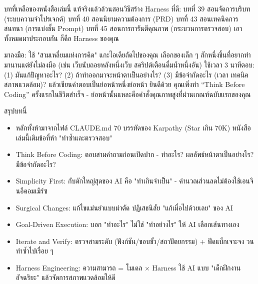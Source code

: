 บทที่เหลือของหนังสือเล่มนี้ แท้จริงแล้วล้วนสอนวิธีสร้าง Harness ที่ดี: บทที่ 39 สอนจัดการบริบท (ระบบความจำโปรเจกต์) บทที่ 40 สอนนิยามความต้องการ (PRD) บทที่ 43 สอนเทคนิคการสนทนา (การแบ่งชั้น Prompt) บทที่ 45 สอนการการันตีคุณภาพ (กระบวนการตรวจสอบ) เอาทั้งหมดมาประกอบกัน ก็คือ Harness ของคุณ

\begin{tcbpractice}{มาลงมือ: ใช้ "สามเหลี่ยมแห่งการคิด" แกะไอเดียถัดไปของคุณ}
เลือกของเล็ก ๆ สักหนึ่งชิ้นที่อยากทำมานานแต่ยังไม่ลงมือ (เช่น เว็บนับถอยหลังหนึ่งเว็บ สคริปต์เตือนดื่มน้ำหนึ่งอัน) ใช้เวลา 3 นาทีตอบ: (1) มันแก้ปัญหาอะไร? (2) ถ้าทำออกมาจะหน้าตาเป็นอย่างไร? (3) มีข้อจำกัดอะไร (เวลา เทคนิค สภาพแวดล้อม)? แล้วเขียนคำตอบเป็นย่อหน้าหนึ่งย่อหน้า ยินดีด้วย คุณเพิ่งทำ “Think Before Coding” ครั้งแรกในชีวิตสำเร็จ - ย่อหน้านั้นแหละคือคำสั่งคุณภาพสูงที่ผ่านเกณฑ์ฉบับแรกของคุณ

\end{tcbpractice}

\begin{tcbsummary}{สรุปบทนี้}
\begin{itemize}
  \item หลักทั้งห้ามาจากไฟล์ CLAUDE.md 70 บรรทัดของ Karpathy (Star เกิน 70K) หนังสือเล่มนี้เติมข้อที่ห้า "ทำซ้ำและตรวจสอบ"
  \item Think Before Coding: ตอบสามคำถามก่อนเปิดปาก - ทำอะไร? ผลลัพธ์หน้าตาเป็นอย่างไร? มีข้อจำกัดอะไร?
  \item Simplicity First: กับดักใหญ่สุดของ AI คือ "ทำเกินจำเป็น" - คำนวณส่วนลดไม่ต้องใช้เอนจินอีคอมเมิร์ซ
  \item Surgical Changes: แก้ไขแม่นยำแบบผ่าตัด ปฏิเสธนิสัย "แก้เผื่อไปด้วยเลย" ของ AI
  \item Goal-Driven Execution: บอก "ทำอะไร" ไม่ใช่ "ทำอย่างไร" ให้ AI เลือกเส้นทางเอง
  \item Iterate and Verify: ตรวจสามระดับ (ฟังก์ชัน/ขอบขั้ว/สถาปัตยกรรม) + ฟีดแบ็กเจาะจง วนทำซ้ำไปเรื่อย ๆ
  \item Harness Engineering: ความสามารถ = โมเดล × Harness ใช้ AI แบบ "เด็กฝึกงานอัจฉริยะ" แล้วจัดการสภาพแวดล้อมให้ดี
\end{itemize}

\end{tcbsummary}
